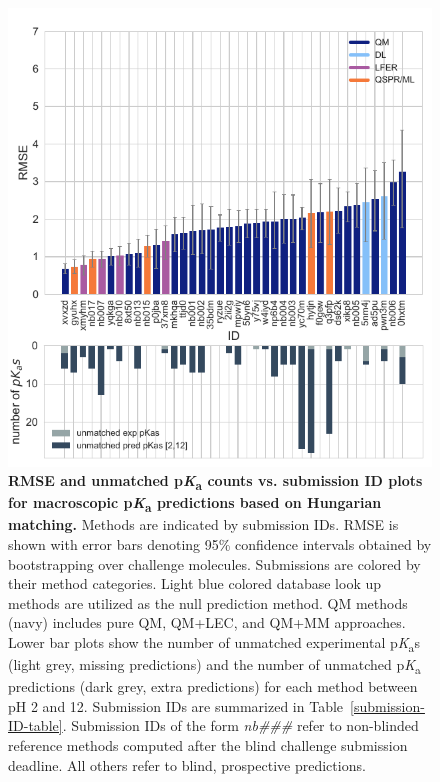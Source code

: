 \documentclass[9pt,lineno,final]{elife}
\newcommand{\pKa}{p\textit{K}\textsubscript{a}}
\begin{document}
\begin{figure}[h]
\centering
\includegraphics[width=0.5\linewidth]{figures/typeIII-rmse-unmatched-pKa-fig.pdf}
\caption{{\bf RMSE and unmatched \pKa{} counts vs. submission ID plots for macroscopic \pKa{} predictions based on Hungarian matching.} 
Methods are indicated by submission IDs. 
RMSE is shown with error bars denoting 95\% confidence intervals obtained by bootstrapping over challenge molecules. 
Submissions are colored by their method categories. Light blue colored database look up methods are utilized as the null prediction method.
QM methods (navy) includes pure QM, QM+LEC, and QM+MM approaches.
Lower bar plots show the number of unmatched experimental \pKa{}s (light grey, missing predictions) and the number of unmatched \pKa{} predictions (dark grey, extra predictions) for each method between pH 2 and 12. Submission IDs are summarized in Table~\ref{submission-ID-table}. Submission IDs of the form \textit{nb\#\#\#} refer to non-blinded reference methods computed after the blind challenge submission deadline. All others refer to blind, prospective predictions. 
}
\label{fig:typeIII-rmse-plot}
\end{figure}
\end{document}
